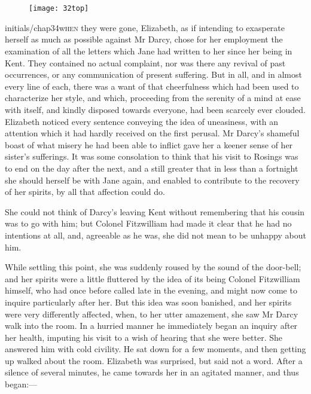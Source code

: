 \chapter[Chapter \thechapter]{}
	
	\begin{figure}[t!]
\centering
\texttt{[image: 32top]}
\end{figure}


\lettrine[lines=6,image=true]{initials/chap34w}{hen}  they were gone, Elizabeth, as if intending to exasperate herself as much as possible against Mr Darcy, chose for her employment the examination of all the letters which Jane had written to her since her being in Kent. They contained no actual complaint, nor was there any revival of past occurrences, or any communication of present suffering. But in all, and in almost every line of each, there was a want of that cheerfulness which had been used to characterize her style, and which, proceeding from the serenity of a mind at ease with itself, and kindly disposed towards everyone, had been scarcely ever clouded. Elizabeth noticed every sentence conveying the idea of uneasiness, with an attention which it had hardly received on the first perusal. Mr Darcy's shameful boast of what misery he had been able to inflict gave her a keener sense of her sister's sufferings. It was some consolation to think that his visit to Rosings was to end on the day after the next, and a still greater that in less than a fortnight she should herself be with Jane again, and enabled to contribute to the recovery of her spirits, by all that affection could do.

She could not think of Darcy's leaving Kent without remembering that his cousin was to go with him; but Colonel Fitzwilliam had made it clear that he had no intentions at all, and, agreeable as he was, she did not mean to be unhappy about him.

While settling this point, she was suddenly roused by the sound of the door-bell; and her spirits were a little fluttered by the idea of its being Colonel Fitzwilliam himself, who had once before called late in the evening, and might now come to inquire particularly after her. But this idea was soon banished, and her spirits were very differently affected, when, to her utter amazement, she saw Mr Darcy walk into the room. In a hurried manner he immediately began an inquiry after her health, imputing his visit to a wish of hearing that she were better. She answered him with cold civility. He sat down for a few moments, and then getting up walked about the room. Elizabeth was surprised, but said not a word. After a silence of several minutes, he came towards her in an agitated manner, and thus began:—

